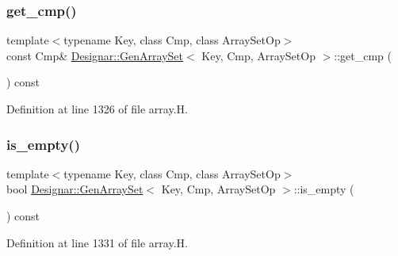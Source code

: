 \subsubsection{\texorpdfstring{get\+\_\+cmp()}{get\_cmp()}\hspace{0.1cm}{\footnotesize\ttfamily [2/2]}}
{\footnotesize\ttfamily template$<$typename Key, class Cmp, class Array\+Set\+Op$>$ \\
const Cmp\& \hyperlink{class_designar_1_1_gen_array_set}{Designar\+::\+Gen\+Array\+Set}$<$ Key, Cmp, Array\+Set\+Op $>$\+::get\+\_\+cmp (\begin{DoxyParamCaption}{ }\end{DoxyParamCaption}) const\hspace{0.3cm}{\ttfamily [inline]}}



Definition at line 1326 of file array.\+H.

\mbox{\label{class_designar_1_1_gen_array_set_aca8ce9f7cb1ded74fd8067a535817836}} 
\subsubsection{\texorpdfstring{is\+\_\+empty()}{is\_empty()}}
{\footnotesize\ttfamily template$<$typename Key, class Cmp, class Array\+Set\+Op$>$ \\
bool \hyperlink{class_designar_1_1_gen_array_set}{Designar\+::\+Gen\+Array\+Set}$<$ Key, Cmp, Array\+Set\+Op $>$\+::is\+\_\+empty (\begin{DoxyParamCaption}{ }\end{DoxyParamCaption}) const\hspace{0.3cm}{\ttfamily [inline]}}



Definition at line 1331 of file array.\+H.

\mbox{\label{class_designar_1_1_gen_array_set_a048871f9ab15af3c26cfda4dbb47d272}} 
